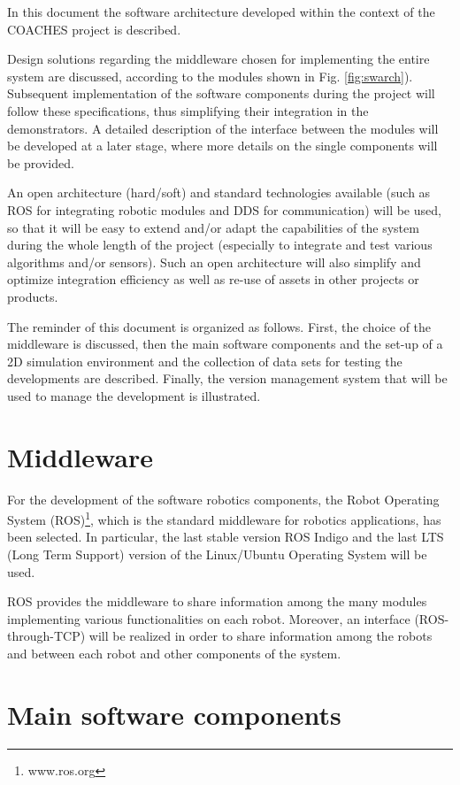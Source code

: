 \documentclass{article}
\begin{document}
In this document the software architecture developed within the
context of the COACHES project is described.

Design solutions regarding the middleware chosen for implementing the entire system are discussed,
according to the modules shown in Fig. \ref{fig:swarch}).
Subsequent implementation of the software components during the project will follow  these  specifications,  thus  simplifying  their  integration  in  the demonstrators. 
A detailed description of the interface between the modules will be developed at a later stage, where more details on the single components will be provided.


An open architecture (hard/soft) and standard technologies available (such 
as ROS for integrating robotic modules and DDS for communication) will be used,
so that it will be 
easy to extend and/or adapt the capabilities of the system during the whole length of 
the  project  (especially  to  integrate  and  test  various  algorithms  and/or  sensors).  Such 
an open architecture will also simplify and optimize integration efficiency as well as re-use of assets in other projects or products. 

The reminder of this document is organized as follows.
First, the choice of the middleware is discussed, then the main software components and the
set-up of a 2D simulation environment and the collection of data sets for testing the developments are described.
Finally, the version management system that will be used to manage the development is illustrated.

\section{Middleware}

For the development of the software robotics components, the Robot Operating System (ROS)\footnote{www.ros.org}, which is the standard middleware for robotics applications, has been selected.
In particular, the last stable version ROS Indigo and the last LTS (Long Term Support) version of the Linux/Ubuntu Operating System will be used.

ROS provides the middleware to share information among the many modules implementing various functionalities on each robot. Moreover, an interface (ROS-through-TCP) will be realized in order to share information among the robots and between each robot and other components of the system.

\section{Main software components}
\end{document}
